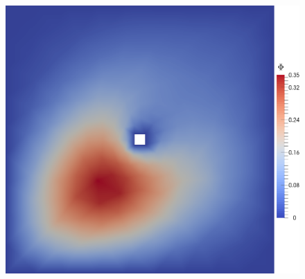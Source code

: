\begin{test}[Diffusion Dominated ADR, $\kappa = 0.1$]
\begin{figure}[h]
\begin{minipage}[t]{0.49\textwidth}
{                \includegraphics[scale=0.1]{Figures/AdaptiveADRkappa1E-1_uDual0.png}
            }
        \end{minipage}
        \begin{minipage}[t]{0.49\textwidth}
            \centering
\end{minipage}
\end{figure}
\end{test}
